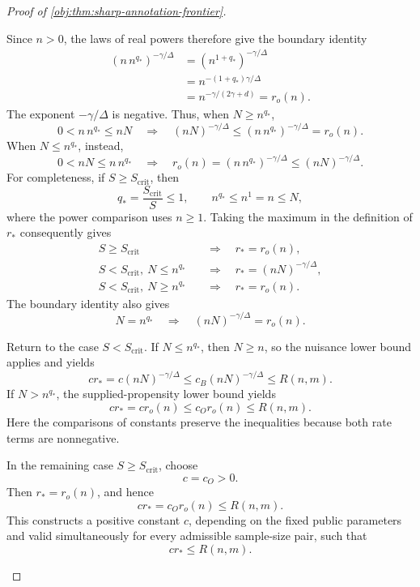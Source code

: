 \documentclass[11pt]{article}
\begin{document}
\begin{proof}[Proof of \cref{obj:thm:sharp-annotation-frontier}]
\begin{enumerate}
Since \(n>0\), the laws of real powers therefore give the boundary identity
\[
\begin{aligned}
(n\,n^{q_*})^{-\gamma/\Delta}
&=(n^{1+q_*})^{-\gamma/\Delta}\\
&=n^{-(1+q_*)\gamma/\Delta}\\
&=n^{-\gamma/(2\gamma+d)}
=r_o(n).
\end{aligned}
\]
The exponent \(-\gamma/\Delta\) is negative. Thus, when \(N\ge n^{q_*}\),
\[
0<n\,n^{q_*}\le nN
\quad\Longrightarrow\quad
(nN)^{-\gamma/\Delta}
\le(n\,n^{q_*})^{-\gamma/\Delta}
=r_o(n).
\]
When \(N\le n^{q_*}\), instead,
\[
0<nN\le n\,n^{q_*}
\quad\Longrightarrow\quad
r_o(n)
=(n\,n^{q_*})^{-\gamma/\Delta}
\le(nN)^{-\gamma/\Delta}.
\]
For completeness, if \(S\ge S_{\mathrm{crit}}\), then
\[
q_*=\frac{S_{\mathrm{crit}}}{S}\le1,
\qquad
n^{q_*}\le n^1=n\le N,
\]
where the power comparison uses \(n\ge1\). Taking the maximum in the definition of \(r_*\) consequently gives
\[
\begin{aligned}
S\ge S_{\mathrm{crit}}
&\quad\Longrightarrow\quad r_*=r_o(n),\\
S<S_{\mathrm{crit}},\ N\le n^{q_*}
&\quad\Longrightarrow\quad r_*=(nN)^{-\gamma/\Delta},\\
S<S_{\mathrm{crit}},\ N\ge n^{q_*}
&\quad\Longrightarrow\quad r_*=r_o(n).
\end{aligned}
\]
The boundary identity also gives
\[
N=n^{q_*}
\quad\Longrightarrow\quad
(nN)^{-\gamma/\Delta}=r_o(n).
\]

Return to the case \(S<S_{\mathrm{crit}}\). If \(N\le n^{q_*}\), then \(N\ge n\), so the nuisance lower bound applies and yields
\[
c r_*
=c(nN)^{-\gamma/\Delta}
\le c_B(nN)^{-\gamma/\Delta}
\le R(n,m).
\]
If \(N>n^{q_*}\), the supplied-propensity lower bound yields
\[
c r_*=c r_o(n)\le c_O r_o(n)\le R(n,m).
\]
Here the comparisons of constants preserve the inequalities because both rate terms are nonnegative.

In the remaining case \(S\ge S_{\mathrm{crit}}\), choose
\[
c=c_O>0.
\]
Then \(r_*=r_o(n)\), and hence
\[
c r_*=c_O r_o(n)\le R(n,m).
\]
This constructs a positive constant \(c\), depending on the fixed public parameters and valid simultaneously for every admissible sample-size pair, such that
\[
c r_*\le R(n,m).
\]


\end{enumerate}
\end{proof}
\end{document}
